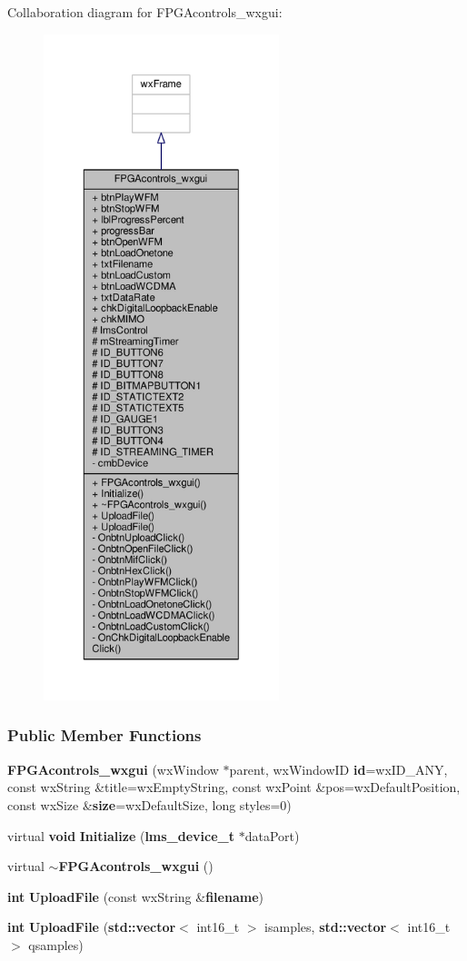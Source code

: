Collaboration diagram for F\+P\+G\+Acontrols\+\_\+wxgui\+:
\nopagebreak
\begin{figure}[H]
\begin{center}
\leavevmode
\includegraphics[height=550pt]{de/d10/classFPGAcontrols__wxgui__coll__graph}
\end{center}
\end{figure}
\subsubsection*{Public Member Functions}
\begin{DoxyCompactItemize}
\item 
{\bf F\+P\+G\+Acontrols\+\_\+wxgui} (wx\+Window $\ast$parent, wx\+Window\+ID {\bf id}=wx\+I\+D\+\_\+\+A\+NY, const wx\+String \&title=wx\+Empty\+String, const wx\+Point \&pos=wx\+Default\+Position, const wx\+Size \&{\bf size}=wx\+Default\+Size, long styles=0)
\item 
virtual {\bf void} {\bf Initialize} ({\bf lms\+\_\+device\+\_\+t} $\ast$data\+Port)
\item 
virtual {\bf $\sim$\+F\+P\+G\+Acontrols\+\_\+wxgui} ()
\item 
{\bf int} {\bf Upload\+File} (const wx\+String \&{\bf filename})
\item 
{\bf int} {\bf Upload\+File} ({\bf std\+::vector}$<$ int16\+\_\+t $>$ isamples, {\bf std\+::vector}$<$ int16\+\_\+t $>$ qsamples)
\end{DoxyCompactItemize}
